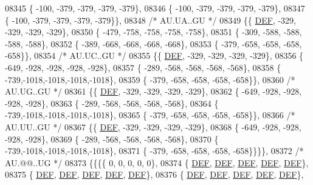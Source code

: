 \begin{DoxyCode}
08345 \{ -100, -379, -379, -379, -379\},
08346 \{ -100, -379, -379, -379, -379\},
08347 \{ -100, -379, -379, -379, -379\}\},
08348 \textcolor{comment}{/* AU.UA..GU */}
08349 \{\{  \mbox{\hyperlink{1_88_84__epars_8h_a397419fc12b37ed479c8abb9d444d843}{DEF}}, -329, -329, -329, -329\},
08350 \{ -479, -758, -758, -758, -758\},
08351 \{ -309, -588, -588, -588, -588\},
08352 \{ -389, -668, -668, -668, -668\},
08353 \{ -379, -658, -658, -658, -658\}\},
08354 \textcolor{comment}{/* AU.UC..GU */}
08355 \{\{  \mbox{\hyperlink{1_88_84__epars_8h_a397419fc12b37ed479c8abb9d444d843}{DEF}}, -329, -329, -329, -329\},
08356 \{ -649, -928, -928, -928, -928\},
08357 \{ -289, -568, -568, -568, -568\},
08358 \{ -739,-1018,-1018,-1018,-1018\},
08359 \{ -379, -658, -658, -658, -658\}\},
08360 \textcolor{comment}{/* AU.UG..GU */}
08361 \{\{  \mbox{\hyperlink{1_88_84__epars_8h_a397419fc12b37ed479c8abb9d444d843}{DEF}}, -329, -329, -329, -329\},
08362 \{ -649, -928, -928, -928, -928\},
08363 \{ -289, -568, -568, -568, -568\},
08364 \{ -739,-1018,-1018,-1018,-1018\},
08365 \{ -379, -658, -658, -658, -658\}\},
08366 \textcolor{comment}{/* AU.UU..GU */}
08367 \{\{  \mbox{\hyperlink{1_88_84__epars_8h_a397419fc12b37ed479c8abb9d444d843}{DEF}}, -329, -329, -329, -329\},
08368 \{ -649, -928, -928, -928, -928\},
08369 \{ -289, -568, -568, -568, -568\},
08370 \{ -739,-1018,-1018,-1018,-1018\},
08371 \{ -379, -658, -658, -658, -658\}\}\}\},
08372 \textcolor{comment}{/* AU.@@..UG */}
08373 \{\{\{\{    0,    0,    0,    0,    0\},
08374 \{  \mbox{\hyperlink{1_88_84__epars_8h_a397419fc12b37ed479c8abb9d444d843}{DEF}},  \mbox{\hyperlink{1_88_84__epars_8h_a397419fc12b37ed479c8abb9d444d843}{DEF}},  \mbox{\hyperlink{1_88_84__epars_8h_a397419fc12b37ed479c8abb9d444d843}{DEF}},  \mbox{\hyperlink{1_88_84__epars_8h_a397419fc12b37ed479c8abb9d444d843}{DEF}},  \mbox{\hyperlink{1_88_84__epars_8h_a397419fc12b37ed479c8abb9d444d843}{DEF}}\},
08375 \{  \mbox{\hyperlink{1_88_84__epars_8h_a397419fc12b37ed479c8abb9d444d843}{DEF}},  \mbox{\hyperlink{1_88_84__epars_8h_a397419fc12b37ed479c8abb9d444d843}{DEF}},  \mbox{\hyperlink{1_88_84__epars_8h_a397419fc12b37ed479c8abb9d444d843}{DEF}},  \mbox{\hyperlink{1_88_84__epars_8h_a397419fc12b37ed479c8abb9d444d843}{DEF}},  \mbox{\hyperlink{1_88_84__epars_8h_a397419fc12b37ed479c8abb9d444d843}{DEF}}\},
08376 \{  \mbox{\hyperlink{1_88_84__epars_8h_a397419fc12b37ed479c8abb9d444d843}{DEF}},  \mbox{\hyperlink{1_88_84__epars_8h_a397419fc12b37ed479c8abb9d444d843}{DEF}},  \mbox{\hyperlink{1_88_84__epars_8h_a397419fc12b37ed479c8abb9d444d843}{DEF}},  \mbox{\hyperlink{1_88_84__epars_8h_a397419fc12b37ed479c8abb9d444d843}{DEF}},  \mbox{\hyperlink{1_88_84__epars_8h_a397419fc12b37ed479c8abb9d444d843}{DEF}}\},

\end{DoxyCode}
